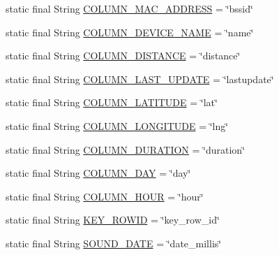 \begin{DoxyCompactItemize}
static final String \hyperlink{classcs_1_1nsense_1_1db_1_1_n_sense_s_q_lite_helper_ab71ac3b7f6963ff8e77345776010b45a}{C\-O\-L\-U\-M\-N\-\_\-\-M\-A\-C\-\_\-\-A\-D\-D\-R\-E\-S\-S} = \char`\"{}bssid\char`\"{}
\item 
static final String \hyperlink{classcs_1_1nsense_1_1db_1_1_n_sense_s_q_lite_helper_a56f69b02d8da96e6d5657ac6184c05f2}{C\-O\-L\-U\-M\-N\-\_\-\-D\-E\-V\-I\-C\-E\-\_\-\-N\-A\-M\-E} = \char`\"{}name\char`\"{}
\item 
static final String \hyperlink{classcs_1_1nsense_1_1db_1_1_n_sense_s_q_lite_helper_afbaabae4c4f5eec5518306c84b72b6e0}{C\-O\-L\-U\-M\-N\-\_\-\-D\-I\-S\-T\-A\-N\-C\-E} = \char`\"{}distance\char`\"{}
\item 
static final String \hyperlink{classcs_1_1nsense_1_1db_1_1_n_sense_s_q_lite_helper_a2ef74045c1e5eef600940407e7da7080}{C\-O\-L\-U\-M\-N\-\_\-\-L\-A\-S\-T\-\_\-\-U\-P\-D\-A\-T\-E} = \char`\"{}lastupdate\char`\"{}
\item 
static final String \hyperlink{classcs_1_1nsense_1_1db_1_1_n_sense_s_q_lite_helper_ae89bdf3f6b5886a52c20fd60d23f762b}{C\-O\-L\-U\-M\-N\-\_\-\-L\-A\-T\-I\-T\-U\-D\-E} = \char`\"{}lat\char`\"{}
\item 
static final String \hyperlink{classcs_1_1nsense_1_1db_1_1_n_sense_s_q_lite_helper_a451ea9bc86c8f3ca072141fc2544ed25}{C\-O\-L\-U\-M\-N\-\_\-\-L\-O\-N\-G\-I\-T\-U\-D\-E} = \char`\"{}lng\char`\"{}
\item 
static final String \hyperlink{classcs_1_1nsense_1_1db_1_1_n_sense_s_q_lite_helper_aa239c67a16978792f5c508aea13a237c}{C\-O\-L\-U\-M\-N\-\_\-\-D\-U\-R\-A\-T\-I\-O\-N} = \char`\"{}duration\char`\"{}
\item 
static final String \hyperlink{classcs_1_1nsense_1_1db_1_1_n_sense_s_q_lite_helper_af9a46b1c32ed79596c97f182ab2fe4dd}{C\-O\-L\-U\-M\-N\-\_\-\-D\-A\-Y} = \char`\"{}day\char`\"{}
\item 
static final String \hyperlink{classcs_1_1nsense_1_1db_1_1_n_sense_s_q_lite_helper_a9e10735627e7603a3fba1e9fa908efa6}{C\-O\-L\-U\-M\-N\-\_\-\-H\-O\-U\-R} = \char`\"{}hour\char`\"{}
\item 
static final String \hyperlink{classcs_1_1nsense_1_1db_1_1_n_sense_s_q_lite_helper_a98ac608a28955ac678219d9eada34781}{K\-E\-Y\-\_\-\-R\-O\-W\-I\-D} = \char`\"{}key\-\_\-row\-\_\-id\char`\"{}
\item 
static final String \hyperlink{classcs_1_1nsense_1_1db_1_1_n_sense_s_q_lite_helper_aa06cac21fc74b8e6402ab0d38b2d6b06}{S\-O\-U\-N\-D\-\_\-\-D\-A\-T\-E} = \char`\"{}date\-\_\-millis\char`\"{}

\end{DoxyCompactItemize}
